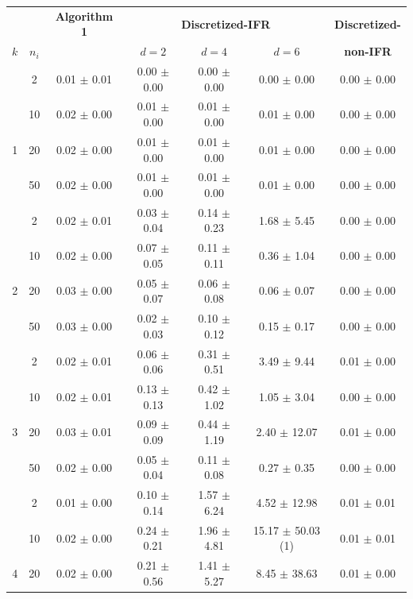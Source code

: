 \begin{table}[h]
\centering
\small
\begin{tabular}{cc|c|ccc|c}
\toprule
 & & \multicolumn{1}{c|}{\textbf{Algorithm 1}} & \multicolumn{3}{c|}{\textbf{Discretized-IFR}} & \multicolumn{1}{c}{\textbf{Discretized-}} \\
\textbf{$k$} & \textbf{$n_i$} & & \textbf{$d=2$} & \textbf{$d=4$} & \textbf{$d=6$} & \textbf{non-IFR} \\
\midrule
 & 2 & 0.01 $\pm$ 0.01 & 0.00 $\pm$ 0.00 & 0.00 $\pm$ 0.00 & 0.00 $\pm$ 0.00 & 0.00 $\pm$ 0.00 \\
 & 10 & 0.02 $\pm$ 0.00 & 0.01 $\pm$ 0.00 & 0.01 $\pm$ 0.00 & 0.01 $\pm$ 0.00 & 0.00 $\pm$ 0.00 \\
1 & 20 & 0.02 $\pm$ 0.00 & 0.01 $\pm$ 0.00 & 0.01 $\pm$ 0.00 & 0.01 $\pm$ 0.00 & 0.00 $\pm$ 0.00 \\
 & 50 & 0.02 $\pm$ 0.00 & 0.01 $\pm$ 0.00 & 0.01 $\pm$ 0.00 & 0.01 $\pm$ 0.00 & 0.00 $\pm$ 0.00 \\
\midrule
 & 2 & 0.02 $\pm$ 0.01 & 0.03 $\pm$ 0.04 & 0.14 $\pm$ 0.23 & 1.68 $\pm$ 5.45 & 0.00 $\pm$ 0.00 \\
 & 10 & 0.02 $\pm$ 0.00 & 0.07 $\pm$ 0.05 & 0.11 $\pm$ 0.11 & 0.36 $\pm$ 1.04 & 0.00 $\pm$ 0.00 \\
2 & 20 & 0.03 $\pm$ 0.00 & 0.05 $\pm$ 0.07 & 0.06 $\pm$ 0.08 & 0.06 $\pm$ 0.07 & 0.00 $\pm$ 0.00 \\
 & 50 & 0.03 $\pm$ 0.00 & 0.02 $\pm$ 0.03 & 0.10 $\pm$ 0.12 & 0.15 $\pm$ 0.17 & 0.00 $\pm$ 0.00 \\
\midrule
 & 2 & 0.02 $\pm$ 0.01 & 0.06 $\pm$ 0.06 & 0.31 $\pm$ 0.51 & 3.49 $\pm$ 9.44 & 0.01 $\pm$ 0.00 \\
 & 10 & 0.02 $\pm$ 0.01 & 0.13 $\pm$ 0.13 & 0.42 $\pm$ 1.02 & 1.05 $\pm$ 3.04 & 0.00 $\pm$ 0.00 \\
3 & 20 & 0.03 $\pm$ 0.01 & 0.09 $\pm$ 0.09 & 0.44 $\pm$ 1.19 & 2.40 $\pm$ 12.07 & 0.01 $\pm$ 0.00 \\
 & 50 & 0.02 $\pm$ 0.00 & 0.05 $\pm$ 0.04 & 0.11 $\pm$ 0.08 & 0.27 $\pm$ 0.35 & 0.00 $\pm$ 0.00 \\
\midrule
 & 2 & 0.01 $\pm$ 0.00 & 0.10 $\pm$ 0.14 & 1.57 $\pm$ 6.24 & 4.52 $\pm$ 12.98 & 0.01 $\pm$ 0.01 \\
 & 10 & 0.02 $\pm$ 0.00 & 0.24 $\pm$ 0.21 & 1.96 $\pm$ 4.81 & 15.17 $\pm$ 50.03 (1) & 0.01 $\pm$ 0.01 \\
4 & 20 & 0.02 $\pm$ 0.00 & 0.21 $\pm$ 0.56 & 1.41 $\pm$ 5.27 & 8.45 $\pm$ 38.63 & 0.01 $\pm$ 0.00 \\

\end{tabular}
\end{table}
